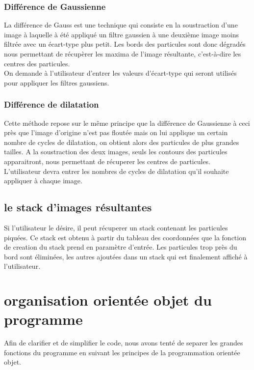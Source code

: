 \subsubsection{Différence de Gaussienne}
La différence de Gauss est une technique qui consiste en la soustraction d'une image à laquelle à été appliqué un filtre gaussien à une deuxième image moins filtrée avec un écart-type plus petit. Les bords des particules sont donc dégradés nous permettant de récupèrer les maxima de l'image résultante, c'est-à-dire les centres des particules.\\
\noindent
On demande à l'utilisateur d'entrer les valeurs d'écart-type qui seront utilisés pour appliquer les filtres gaussiens.

\subsubsection{Différence de dilatation}

Cette méthode repose sur le même principe que la différence de Gaussienne à ceci près que l'image d'origine n'est pas floutée mais on lui applique un certain nombre de cycles de dilatation, on obtient alors des particules de plus grandes tailles. A la soustraction des deux images, seuls les contours des particules apparaitront, nous permettant de récuperer les centres de particules.\\
L'utilisateur devra entrer les nombres de cycles de dilatation qu'il souhaite appliquer à chaque image.

\subsection{le stack d'images résultantes}
Si l'utilisateur le désire, il peut récuperer un stack contenant les particules piquées. Ce stack est obtenu à partir du tableau des coordonnées que la fonction de creation du stack prend en paramètre d'entrée.
Les particules trop près du bord sont éliminées, les autres ajoutées dans un stack qui est finalement affiché à l'utilisateur.

\section{organisation orientée objet du programme}
Afin de clarifier et de simplifier le code, nous avons tenté de separer les grandes fonctions du programme en suivant les principes de la programmation orientée objet.

